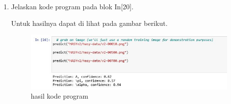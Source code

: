 \begin{enumerate}
\item Jelaskan kode program pada blok  In[20].

Untuk hasilnya dapat di lihat pada gambar berikut.
\begin{figure}[ht]
\centering
\includegraphics[scale=0.4]{figures/1174012/chapter7/2,20.JPG}
\caption{hasil kode program}
\label{Contoh}
\end{figure}

\end{enumerate}